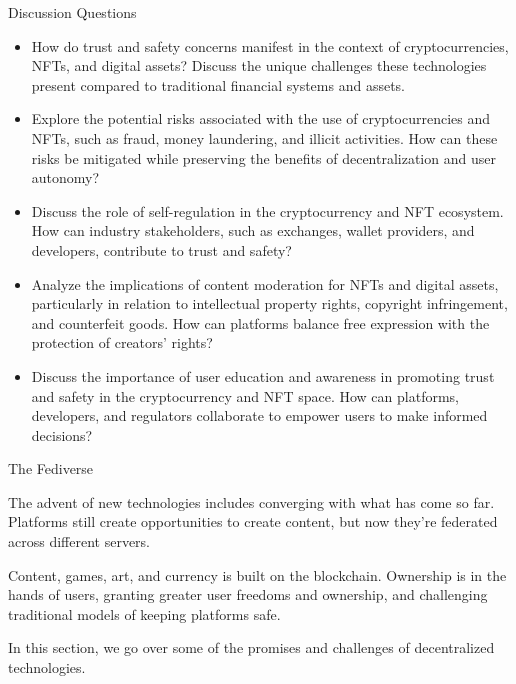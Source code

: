 \documentclass[nobackground,dvipsnames,table]{beamer}
\begin{document}
\begin{frame}{Discussion Questions}

\footnotesize{

\begin{itemize}
    \item How do trust and safety concerns manifest in the context of cryptocurrencies, NFTs, and digital assets? Discuss the unique challenges these technologies present compared to traditional financial systems and assets.
    \item Explore the potential risks associated with the use of cryptocurrencies and NFTs, such as fraud, money laundering, and illicit activities. How can these risks be mitigated while preserving the benefits of decentralization and user autonomy?
    \item Discuss the role of self-regulation in the cryptocurrency and NFT ecosystem. How can industry stakeholders, such as exchanges, wallet providers, and developers, contribute to trust and safety?
    \item Analyze the implications of content moderation for NFTs and digital assets, particularly in relation to intellectual property rights, copyright infringement, and counterfeit goods. How can platforms balance free expression with the protection of creators' rights?
    \item Discuss the importance of user education and awareness in promoting trust and safety in the cryptocurrency and NFT space. How can platforms, developers, and regulators collaborate to empower users to make informed decisions?
\end{itemize}
}
\end{frame}




\begin{frame}{The Fediverse}

The advent of new technologies includes converging with what has come so far.  Platforms still create opportunities to create content, but now they’re federated across different servers. \newline 

Content, games, art, and currency is built on the blockchain. Ownership is in the hands of users, granting greater user freedoms and ownership, and challenging traditional models of keeping platforms safe. \newline 

In this section, we go over some of the promises and challenges of decentralized technologies.

\end{frame}
\end{document}
